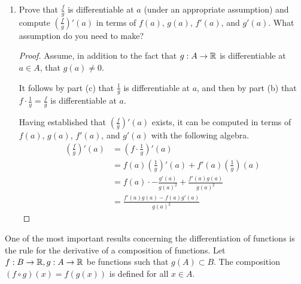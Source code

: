 \documentclass[../main.tex]{subfiles}
\begin{document}
\begin{exercise}
\begin{enumerate}[label={(\alph*)}]
\begin{proof}
\begin{align*}
            \end{align*}
        \end{proof}
        \item Prove that $\frac{f}{g}$ is differentiable at $a$ (under an appropriate assumption) and compute $(\frac{f}{g})'(a)$ in terms of $f(a)$, $g(a)$, $f'(a)$, and $g'(a)$. What assumption do you need to make?
        \begin{proof}
            Assume, in addition to the fact that $g:A\to\mathbb{R}$ is differentiable at $a\in A$, that $g(a)\neq 0$.\par
            It follows by part (c) that $\frac{1}{g}$ is differentiable at $a$, and then by part (b) that $f\cdot\frac{1}{g}=\frac{f}{g}$ is differentiable at $a$.\par
            Having established that $(\frac{f}{g})'(a)$ exists, it can be computed in terms of $f(a)$, $g(a)$, $f'(a)$, and $g'(a)$ with the following algebra.
            \begin{align*}
                \left( \frac{f}{g} \right)'(a) &= \left( f\cdot\frac{1}{g} \right)'(a)\\
                &= f(a)\left( \frac{1}{g} \right)'(a)+f'(a)\left( \frac{1}{g} \right)(a)\\
                &= f(a)\cdot -\frac{g'(a)}{g(a)^2}+\frac{f'(a)g(a)}{g(a)^2}\\
                &= \frac{f'(a)g(a)-f(a)g'(a)}{g(a)^2}
            \end{align*}
        \end{proof}
    \end{enumerate}
\end{exercise}

One of the most important results concerning the differentiation of functions is the rule for the derivative of a composition of functions. Let $f:B\to\mathbb{R},g:A\to\mathbb{R}$ be functions such that $g(A)\subset B$. The composition $(f\circ g)(x)=f(g(x))$ is defined for all $x\in A$.
\end{document}
